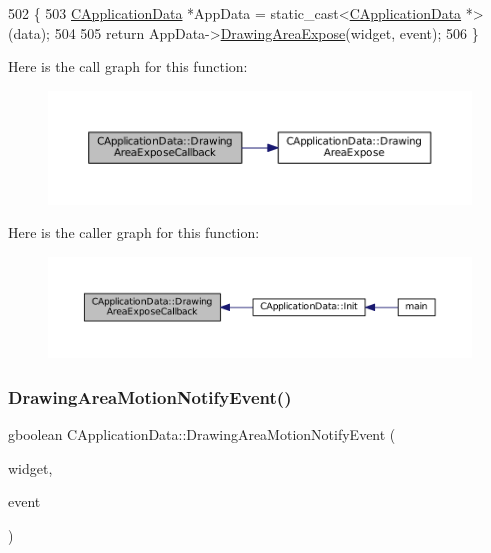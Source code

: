\begin{DoxyCode}
502                                                                                                            
      \{
503     \hyperlink{classCApplicationData}{CApplicationData} *AppData = \textcolor{keyword}{static\_cast<}\hyperlink{classCApplicationData}{CApplicationData} *\textcolor{keyword}{>}(data);
504 
505     \textcolor{keywordflow}{return} AppData->\hyperlink{classCApplicationData_ae998e896194920e08f69f321f3bc9500}{DrawingAreaExpose}(widget, event);
506 \}
\end{DoxyCode}
Here is the call graph for this function\+:
\nopagebreak
\begin{figure}[H]
\begin{center}
\leavevmode
\includegraphics[width=350pt]{classCApplicationData_af2ec09e61420f6c493d7ef25e4a7bd11_cgraph}
\end{center}
\end{figure}
Here is the caller graph for this function\+:
\nopagebreak
\begin{figure}[H]
\begin{center}
\leavevmode
\includegraphics[width=350pt]{classCApplicationData_af2ec09e61420f6c493d7ef25e4a7bd11_icgraph}
\end{center}
\end{figure}
\hypertarget{classCApplicationData_a9b53201c01b399df18b02d1e93213e45}{}\label{classCApplicationData_a9b53201c01b399df18b02d1e93213e45} 
\subsubsection{\texorpdfstring{Drawing\+Area\+Motion\+Notify\+Event()}{DrawingAreaMotionNotifyEvent()}}
{\footnotesize\ttfamily gboolean C\+Application\+Data\+::\+Drawing\+Area\+Motion\+Notify\+Event (\begin{DoxyParamCaption}\item[{Gtk\+Widget $\ast$}]{widget,  }\item[{Gdk\+Event\+Motion $\ast$}]{event }\end{DoxyParamCaption})\hspace{0.3cm}{\ttfamily [protected]}}



